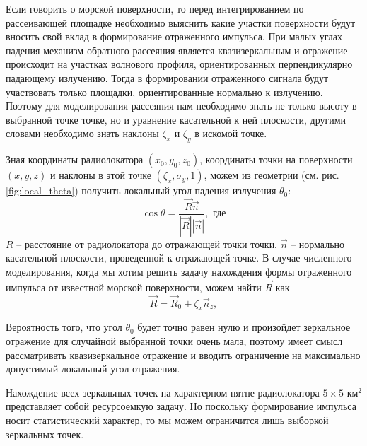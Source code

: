 Если говорить о морской поверхности, то перед интегрированием по рассеивающей
площадке необходимо выяснить какие участки поверхности будут вносить свой вклад
в формирование отраженного импульса.  При малых углах падения механизм обратного  рассеяния является квазизеркальным и отражение происходит на участках волнового профиля, ориентированных
перпендикулярно падающему излучению. Тогда в формировании отраженного сигнала
будут участвовать только площадки, ориентированные нормально к излучению. 
Поэтому для моделирования рассеяния нам необходимо знать не только высоту
в выбранной точке точке, но и уравнение касательной к ней плоскости, другими словами необходимо знать наклоны $\zeta_x$ и  $\zeta_y$ в искомой точке.


Зная координаты радиолокатора  $(x_0,y_0,z_0)$, координаты точки на
поверхности $(x,y,z)$ и наклоны в этой точке $(\zeta_x,\sigma_y,1)$, можем из
геометрии (см. рис. \ref{fig:local_theta}) получить локальный угол падения
излучения $\theta_0$:
\begin{equation}
    \label{eq:local_theta}
    \cos \theta =  \frac{\vec R \vec n}{|\vec R| |\vec n|}, \text{ где}
\end{equation}
$R$ -- расстояние от радиолокатора до отражающей точки точки,
 $\vec n$ -- нормально касательной плоскости, проведенной к отражающей точке.
 В случае численного моделирования, когда мы хотим решить задачу нахождения
 формы отраженного импульса от известной морской поверхности, можем найти
 $\vec R$ как
 \begin{equation}
     \label{eq:R_1}
     \vec R = \vec R_0 + \zeta_x \vec n_z,
 \end{equation}




Вероятность того, что угол $\theta_0$ будет точно равен нулю и произойдет
зеркальное отражение для случайной выбранной точки очень мала, поэтому имеет
смысл рассматривать квазизеркальное отражение и вводить ограничение на
максимально допустимый локальный угол отражения. 

Нахождение всех зеркальных точек на характерном пятне радиолокатора  $5\times
5 \text{ км}^2$ представляет собой ресурсоемкую задачу. Но поскольку формирование
импульса носит статистический характер, то мы можем ограничится лишь выборкой зеркальных точек. 

